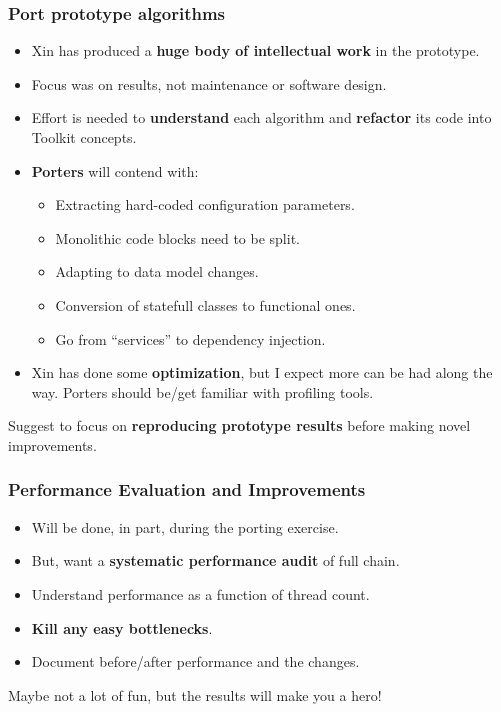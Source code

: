 \documentclass[xcolor=dvipsnames]{beamer}
\begin{document}
\begin{frame}
  \frametitle{Port prototype algorithms}

  \begin{itemize}\small
  \item Xin has produced a \textbf{huge body of intellectual work} in the prototype.
  \item Focus was on results, not maintenance or software design.
  \item Effort is needed to \textbf{understand} each algorithm and \textbf{refactor} its code into Toolkit concepts.
  \item \textbf{Porters} will contend with:
    \begin{itemize}\footnotesize
    \item Extracting hard-coded configuration parameters.
    \item Monolithic code blocks need to be split.
    \item Adapting to data model changes.
    \item Conversion of statefull classes to functional ones.
    \item Go from ``services'' to dependency injection.
    \end{itemize}
  \item Xin has done some \textbf{optimization}, but I expect more can be had
    along the way.  Porters should be/get familiar with profiling
    tools.
  \end{itemize}
  Suggest to focus on \textbf{reproducing prototype results} before making novel improvements.
\end{frame}

\begin{frame}
  \frametitle{Performance Evaluation and Improvements}

  \begin{itemize}
  \item Will be done, in part, during the porting exercise.
  \item But, want a \textbf{systematic performance audit} of full chain.
  \item Understand performance as a function of thread count.
  \item \textbf{Kill any easy bottlenecks}.
  \item Document before/after performance and the changes.
  \end{itemize}

  Maybe not a lot of fun, but the results will make you a hero!

\end{frame}
\end{document}
